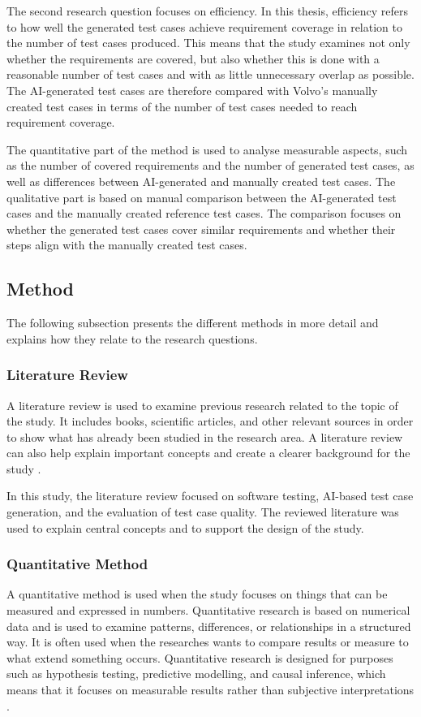 \documentclass[a4paper,12pt]{article}
\begin{document}
The second research question focuses on efficiency. In this thesis, efficiency refers to how well the generated test cases achieve requirement coverage in relation to the number of test cases produced. This means that the study examines not only whether the requirements are covered, but also whether this is done with a reasonable number of test cases and with as little unnecessary overlap as possible. The AI-generated test cases are therefore compared with Volvo’s manually created test cases in terms of the number of test cases needed to reach requirement coverage.

The quantitative part of the method is used to analyse measurable aspects, such as the number of covered requirements and the number of generated test cases, as well as differences between AI-generated and manually created test cases. The qualitative part is based on manual comparison between the AI-generated test cases and the manually created reference test cases. The comparison focuses on whether the generated test cases cover similar requirements and whether their steps align with the manually created test cases.

\subsection{Method}
The following subsection presents the different methods in more detail and explains how they relate to the research questions.

\subsubsection{Literature Review}
A literature review is used to examine previous research related to the topic of the study. It includes books, scientific articles, and other relevant sources in order to show what has already been studied in the research area. A literature review can also help explain important concepts and create a clearer background for the study \cite{usc_literature_review}.

In this study, the literature review focused on software testing, AI-based test case generation, and the evaluation of test case quality. The reviewed literature was used to explain central concepts and to support the design of the study. 

\subsubsection{Quantitative Method}
A quantitative method is used when the study focuses on things that can be measured and expressed in numbers. Quantitative research is based on numerical data and is used to examine patterns, differences, or relationships in a structured way. It is often used when the researches wants to compare results or measure to what extend something occurs. Quantitative research is designed for purposes such as hypothesis testing, predictive modelling, and causal inference, which means that it focuses on measurable results rather than subjective interpretations \cite{lim2025quantitative}.
\end{document}
